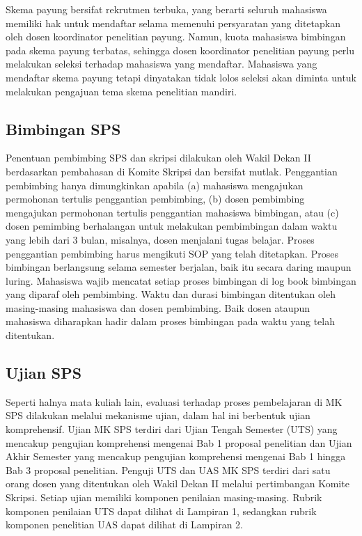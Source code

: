\documentclass[
  indonesian,
  letterpaper,
]{scrbook}
\begin{document}
Skema payung bersifat rekrutmen terbuka, yang berarti seluruh mahasiswa
memiliki hak untuk mendaftar selama memenuhi persyaratan yang ditetapkan
oleh dosen koordinator penelitian payung. Namun, kuota mahasiswa
bimbingan pada skema payung terbatas, sehingga dosen koordinator
penelitian payung perlu melakukan seleksi terhadap mahasiswa yang
mendaftar. Mahasiswa yang mendaftar skema payung tetapi dinyatakan tidak
lolos seleksi akan diminta untuk melakukan pengajuan tema skema
penelitian mandiri.

\subsection*{Bimbingan SPS}\label{bimbingan-sps}

Penentuan pembimbing SPS dan skripsi dilakukan oleh Wakil Dekan II
berdasarkan pembahasan di Komite Skripsi dan bersifat mutlak.
Penggantian pembimbing hanya dimungkinkan apabila (a) mahasiswa
mengajukan permohonan tertulis penggantian pembimbing, (b) dosen
pembimbing mengajukan permohonan tertulis penggantian mahasiswa
bimbingan, atau (c) dosen pemimbing berhalangan untuk melakukan
pembimbingan dalam waktu yang lebih dari 3 bulan, misalnya, dosen
menjalani tugas belajar. Proses penggantian pembimbing harus mengikuti
SOP yang telah ditetapkan. Proses bimbingan berlangsung selama semester
berjalan, baik itu secara daring maupun luring. Mahasiswa wajib mencatat
setiap proses bimbingan di log book bimbingan yang diparaf oleh
pembimbing. Waktu dan durasi bimbingan ditentukan oleh masing-masing
mahasiswa dan dosen pembimbing. Baik dosen ataupun mahasiswa diharapkan
hadir dalam proses bimbingan pada waktu yang telah ditentukan.

\subsection*{Ujian SPS}\label{ujian-sps}

Seperti halnya mata kuliah lain, evaluasi terhadap proses pembelajaran
di MK SPS dilakukan melalui mekanisme ujian, dalam hal ini berbentuk
ujian komprehensif. Ujian MK SPS terdiri dari Ujian Tengah Semester
(UTS) yang mencakup pengujian komprehensi mengenai Bab 1 proposal
penelitian dan Ujian Akhir Semester yang mencakup pengujian komprehensi
mengenai Bab 1 hingga Bab 3 proposal penelitian. Penguji UTS dan UAS MK
SPS terdiri dari satu orang dosen yang ditentukan oleh Wakil Dekan II
melalui pertimbangan Komite Skripsi. Setiap ujian memiliki komponen
penilaian masing-masing. Rubrik komponen penilaian UTS dapat dilihat di
Lampiran 1, sedangkan rubrik komponen penelitian UAS dapat dilihat di
Lampiran 2.
\end{document}
